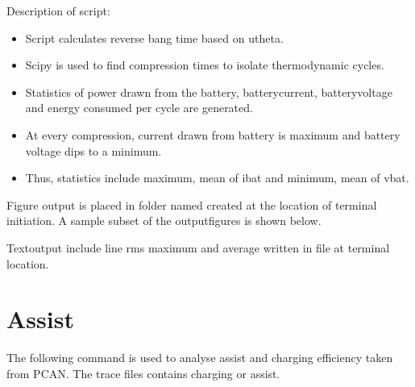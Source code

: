 \documentclass[letterpaper,10pt,english]{sphinxmanual}
\begin{document}
\sphinxAtStartPar
Description of script:
\begin{itemize}
\item {} 
\sphinxAtStartPar
Script calculates reverse bang time based on utheta.

\item {} 
\sphinxAtStartPar
Sci\sphinxhyphen{}py is used to find compression times to isolate thermodynamic cycles.

\item {} 
\sphinxAtStartPar
Statistics of power drawn from the battery, battery\sphinxhyphen{}current, battery\sphinxhyphen{}voltage and energy consumed per cycle are generated.

\item {} 
\sphinxAtStartPar
At every compression, current drawn from battery is maximum and battery voltage dips to a minimum.

\item {} 
\sphinxAtStartPar
Thus, statistics include maximum, mean of ibat and minimum, mean of vbat.

\end{itemize}

\sphinxAtStartPar
Figure output is placed in folder named  created at the location of terminal initiation.
A sample subset of the output\sphinxhyphen{}figures is shown below.

\noindent{}

\noindent{}

\noindent{}

\noindent{}

\sphinxAtStartPar
Text\sphinxhyphen{}output include line rms maximum and average written in  file at terminal location.

\sphinxstepscope


\chapter{Assist}
\label{\detokenize{assist:assist}}\label{\detokenize{assist::doc}}
\sphinxAtStartPar
The following command is used to analyse assist and charging efficiency taken from PCAN.
The trace files contains charging or assist.
\end{document}
